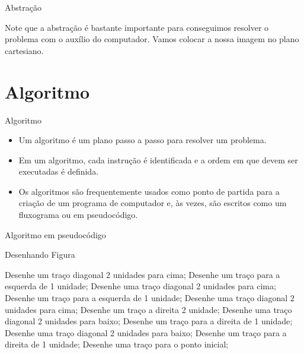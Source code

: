 \documentclass{beamer}
\begin{document}
\begin{frame}{Abstração}

Note que a abstração é bastante importante para conseguimos resolver o problema com o auxílio do computador. Vamos colocar a nossa imagem no plano cartesiano.

\begin{center}

\end{center}


\end{frame}

\section{Algoritmo}

\begin{frame}{Algoritmo}

\begin{itemize}
    \item Um algoritmo é um plano passo a passo para resolver um problema.
    \item Em um algoritmo, cada instrução é identificada e a ordem em que devem ser executadas é definida. 
    \item Os algoritmos são frequentemente usados como ponto de partida para a criação de um programa de computador e, às vezes, são escritos como um fluxograma ou em pseudocódigo. 
\end{itemize}



\end{frame}



\begin{frame}{Algoritmo em pseudocódigo}


\begin{algorithm}[H]
\caption{Desenhando Figura}
\begin{algorithmic}
\State Desenhe um traço diagonal 2 unidades para cima;
\State Desenhe um traço para a esquerda de 1 unidade;
\State Desenhe uma traço diagonal 2 unidades para cima;
\State Desenhe um traço para a esquerda de 1 unidade;
\State Desenhe uma traço diagonal 2 unidades para cima;
\State Desenhe um traço a direita 2 unidade;
\State Desenhe uma traço diagonal 2 unidades para baixo;
\State Desenhe um traço para a direita de 1 unidade;
\State Desenhe uma traço diagonal 2 unidades para baixo;
\State Desenhe um traço para a direita de 1 unidade;
\State Desenhe uma traço para o ponto inicial;
\end{algorithmic}
\end{algorithm}

\end{frame}
\end{document}
